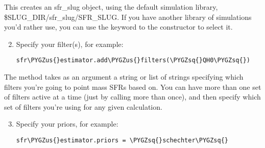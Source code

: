 \documentclass[letterpaper,10pt,english]{sphinxmanual}
\def\PYGZus{\char`\_}
\def\PYGZsq{\char`\'}
\renewcommand\PYGZsq{\textquotesingle}
\begin{document}
This creates an sfr\_slug object, using the default simulation library, \$SLUG\_DIR/sfr\_slug/SFR\_SLUG. If you have another library of simulations you'd rather use, you can use the  keyword to the  constructor to select it.
\begin{enumerate}
\setcounter{enumi}{1}
\item {} 
Specify your filter(s), for example:

\begin{Verbatim}[commandchars=\\\{\}]
sfr\PYGZus{}estimator.add\PYGZus{}filters(\PYGZsq{}QH0\PYGZsq{})
\end{Verbatim}

\end{enumerate}

The  method takes as an argument a string or list of strings specifying which filters you're going to point mass SFRs based on. You can have more than one set of filters active at a time (just by calling  more than once), and then specify which set of filters you're using for any given calculation.
\begin{enumerate}
\setcounter{enumi}{2}
\item {} 
Specify your priors, for example:

\begin{Verbatim}[commandchars=\\\{\}]
sfr\PYGZus{}estimator.priors = \PYGZsq{}schechter\PYGZsq{}
\end{Verbatim}

\end{enumerate}
\end{document}
